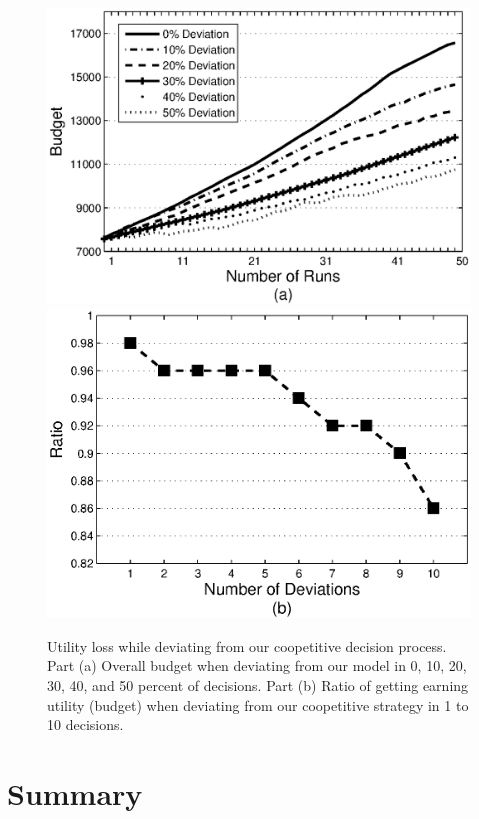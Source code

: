 \begin{figure}%
\includegraphics[scale=0.55]{Figures/graphdev.eps}
\includegraphics[scale=0.55]{Figures/graphdev2.eps}
\caption{Utility loss while deviating from our coopetitive
decision process. Part (a) Overall budget when deviating from our
model in 0, 10, 20, 30, 40, and 50 percent of decisions. Part (b)
Ratio of getting earning utility (budget) when deviating from our
coopetitive strategy in 1 to 10 decisions.} \label{graph_dev}
\end{figure}

\section{Summary}\label{sec:conclusion-cha3}

